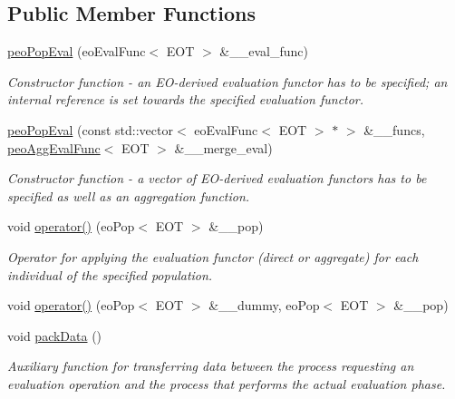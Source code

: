 \subsection*{Public Member Functions}
\begin{CompactItemize}
\item 
\hyperlink{classpeoPopEval_878297ba0de14593bd9cc03b2daf52df}{peo\-Pop\-Eval} (eo\-Eval\-Func$<$ EOT $>$ \&\_\-\_\-eval\_\-func)
\begin{CompactList}\small\item\em Constructor function - an EO-derived evaluation functor has to be specified; an internal reference is set towards the specified evaluation functor. \item\end{CompactList}\item 
\hyperlink{classpeoPopEval_088822da7a0c92bc21574358d2e5f87c}{peo\-Pop\-Eval} (const std::vector$<$ eo\-Eval\-Func$<$ EOT $>$ $\ast$ $>$ \&\_\-\_\-funcs, \hyperlink{classpeoAggEvalFunc}{peo\-Agg\-Eval\-Func}$<$ EOT $>$ \&\_\-\_\-merge\_\-eval)
\begin{CompactList}\small\item\em Constructor function - a vector of EO-derived evaluation functors has to be specified as well as an aggregation function. \item\end{CompactList}\item 
void \hyperlink{classpeoPopEval_593dd60fc004edea8994d5575bf66e05}{operator()} (eo\-Pop$<$ EOT $>$ \&\_\-\_\-pop)
\begin{CompactList}\small\item\em Operator for applying the evaluation functor (direct or aggregate) for each individual of the specified population. \item\end{CompactList}\item 
void \hyperlink{classpeoPopEval_fd942c2b66f31c7d12a9ad48f1529a16}{operator()} (eo\-Pop$<$ EOT $>$ \&\_\-\_\-dummy, eo\-Pop$<$ EOT $>$ \&\_\-\_\-pop)
\item 
void \hyperlink{classpeoPopEval_95351dcd81d1bf878d839e52a02a902d}{pack\-Data} ()
\begin{CompactList}\small\item\em Auxiliary function for transferring data between the process requesting an evaluation operation and the process that performs the actual evaluation phase. \item\end{CompactList}\item 

\end{CompactItemize}
